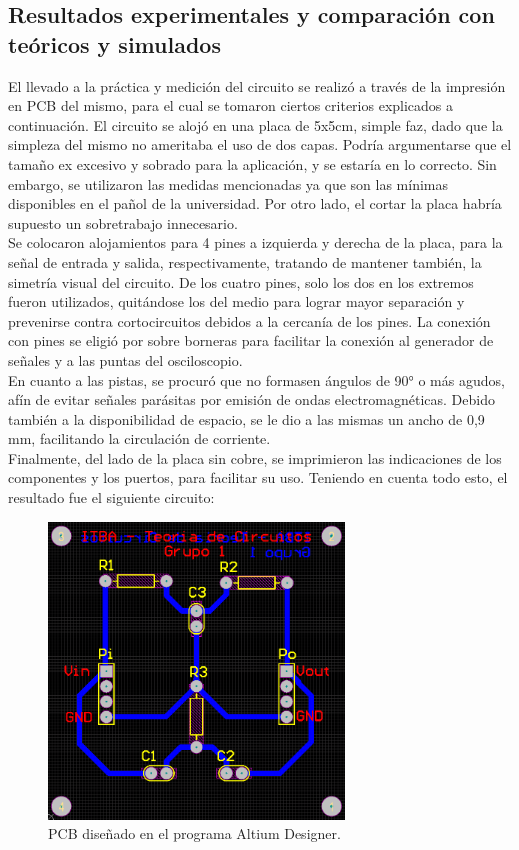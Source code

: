 \subsection{Resultados experimentales y comparaci\'on con te\'oricos y simulados}
El llevado a la pr\'actica y medici\'on del circuito se realiz\'o a trav\'es de la impresi\'on en PCB del mismo, para el cual se tomaron ciertos criterios explicados a continuaci\'on.
El circuito se aloj\'o en una placa de 5x5cm, simple faz, dado que la simpleza del mismo no ameritaba el uso de dos capas.
Podr\'ia argumentarse que el tama\~no ex excesivo y sobrado para la aplicaci\'on, y se estar\'ia en lo correcto.
Sin embargo, se utilizaron las medidas mencionadas ya que son las m\'inimas disponibles en el pa\~nol de la universidad.
Por otro lado, el cortar la placa habr\'ia supuesto un sobretrabajo innecesario. \\
Se colocaron alojamientos para 4 pines a izquierda y derecha de la placa, para la se\~nal de entrada y salida, respectivamente, tratando de mantener tambi\'en, la simetr\'ia visual del circuito.
De los cuatro pines, solo los dos en los extremos fueron utilizados, quit\'andose los del medio para lograr mayor separaci\'on y prevenirse contra cortocircuitos debidos a la cercan\'ia de los pines.
La conexi\'on con pines se eligi\'o por sobre borneras para facilitar la conexi\'on al generador de se\~nales y a las puntas del osciloscopio.\\
En cuanto a las pistas, se procur\'o que no formasen \'angulos de 90° o m\'as agudos, af\'in de evitar se\~nales par\'asitas por emisi\'on de ondas electromagn\'eticas.
Debido tambi\'en a la disponibilidad de espacio, se le dio a las mismas un ancho de 0,9 mm, facilitando la circulaci\'on de corriente.\\
Finalmente, del lado de la placa sin cobre, se imprimieron las indicaciones de los componentes y los puertos, para facilitar su uso.
Teniendo en cuenta todo esto, el resultado fue el siguiente circuito:
\begin{figure}[H]
    \centering
    \begin{minipage}{\textwidth}
        \centering
        \includegraphics[width=0.7\textwidth]{./EJ1/PCB.png}
        \caption{PCB dise\~nado en el programa Altium Designer.}
        \label{fig: PCB_Altium}
    \end{minipage}\hfill
\end{figure}
